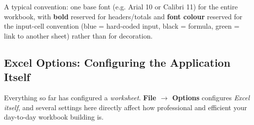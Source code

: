 \documentclass[11pt,a4paper]{article}
\begin{document}
A typical convention: one base font (e.g. Arial 10 or Calibri 11) for the entire workbook, with \textbf{bold} reserved for headers/totals and \textbf{font colour} reserved for the input-cell convention (blue = hard-coded input, black = formula, green = link to another sheet) rather than for decoration.

\subsection{Excel Options: Configuring the Application Itself}
\label{sec:exceloptions}

Everything so far has configured a \emph{worksheet}. \textbf{File $\rightarrow$ Options} configures \emph{Excel itself}, and several settings here directly affect how professional and efficient your day-to-day workbook building is.
\end{document}
